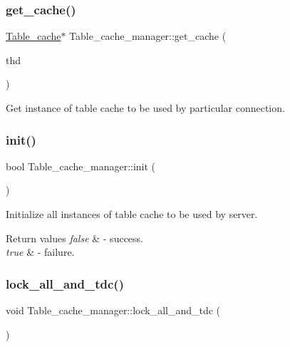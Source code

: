 \subsubsection{\texorpdfstring{get\+\_\+cache()}{get\_cache()}}
{\footnotesize\ttfamily \mbox{\hyperlink{classTable__cache}{Table\+\_\+cache}}$\ast$ Table\+\_\+cache\+\_\+manager\+::get\+\_\+cache (\begin{DoxyParamCaption}\item[{T\+HD $\ast$}]{thd }\end{DoxyParamCaption})\hspace{0.3cm}{\ttfamily [inline]}}

Get instance of table cache to be used by particular connection. \mbox{\label{classTable__cache__manager_a418d8fa95acd7c7fd3330f4244cec571}} 
\subsubsection{\texorpdfstring{init()}{init()}}
{\footnotesize\ttfamily bool Table\+\_\+cache\+\_\+manager\+::init (\begin{DoxyParamCaption}\item[{void}]{ }\end{DoxyParamCaption})}

Initialize all instances of table cache to be used by server.


\begin{DoxyRetVals}{Return values}
{\em false} & -\/ success. \\
\hline
{\em true} & -\/ failure. \\
\hline
\end{DoxyRetVals}
\mbox{\label{classTable__cache__manager_a2b8e9bbb39f7c6b948fdf47846627a22}} 
\subsubsection{\texorpdfstring{lock\+\_\+all\+\_\+and\+\_\+tdc()}{lock\_all\_and\_tdc()}}
{\footnotesize\ttfamily void Table\+\_\+cache\+\_\+manager\+::lock\+\_\+all\+\_\+and\+\_\+tdc (\begin{DoxyParamCaption}{ }\end{DoxyParamCaption})}


